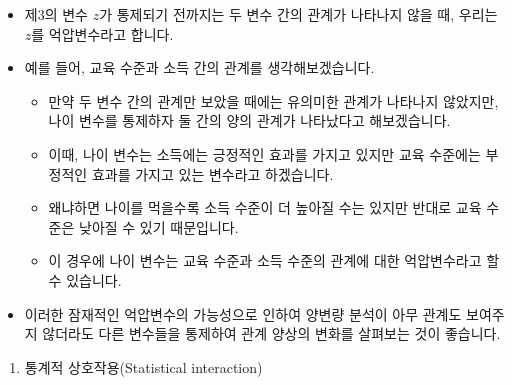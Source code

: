 \documentclass[]{book}
\providecommand{\tightlist}{%
  \setlength{\itemsep}{0pt}\setlength{\parskip}{0pt}}
\begin{document}
\begin{itemize}
\tightlist
\item
  제3의 변수 \(z\)가 통제되기 전까지는 두 변수 간의 관계가 나타나지 않을 때, 우리는 \(z\)를 억압변수라고 합니다.
\item
  예를 들어, 교육 수준과 소득 간의 관계를 생각해보겠습니다.

  \begin{itemize}
  \tightlist
  \item
    만약 두 변수 간의 관계만 보았을 때에는 유의미한 관계가 나타나지 않았지만, 나이 변수를 통제하자 둘 간의 양의 관계가 나타났다고 해보겠습니다.
  \item
    이때, 나이 변수는 소득에는 긍정적인 효과를 가지고 있지만 교육 수준에는 부정적인 효과를 가지고 있는 변수라고 하겠습니다.
  \item
    왜냐하면 나이를 먹을수록 소득 수준이 더 높아질 수는 있지만 반대로 교육 수준은 낮아질 수 있기 때문입니다.
  \item
    이 경우에 나이 변수는 교육 수준과 소득 수준의 관계에 대한 억압변수라고 할 수 있습니다.
  \end{itemize}
\item
  이러한 잠재적인 억압변수의 가능성으로 인하여 양변량 분석이 아무 관계도 보여주지 않더라도 다른 변수들을 통제하여 관계 양상의 변화를 살펴보는 것이 좋습니다.
\end{itemize}

\begin{enumerate}
\def\labelenumi{\arabic{enumi}.}
\setcounter{enumi}{4}
\tightlist
\item
  통계적 상호작용(Statistical interaction)
\end{enumerate}
\end{document}
